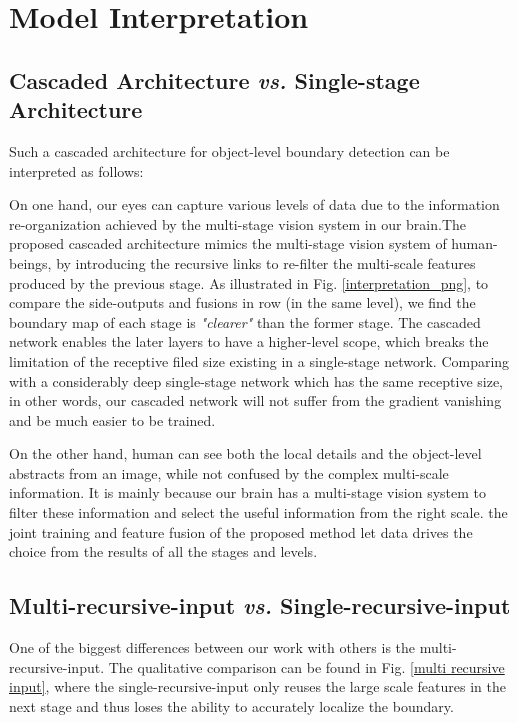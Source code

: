 \documentclass[senior]{IPSstyle}
\begin{document}
\section{Model Interpretation} \label{interpretation}
\subsection{Cascaded Architecture \emph{vs.} Single-stage Architecture}
Such a cascaded architecture for object-level boundary detection can be interpreted as follows:

On one hand, our eyes can capture various levels of data due to the information re-organization achieved by the multi-stage vision system in our brain.The proposed cascaded architecture mimics the multi-stage vision system of human-beings, by introducing the recursive links to re-filter the multi-scale features produced by the previous stage. As illustrated in Fig. \ref{interpretation_png}, to compare the side-outputs and fusions in row (in the same level), we find the boundary map of each stage is \emph{"clearer"} than the former stage. The cascaded network enables the later layers to have a higher-level scope, which breaks the limitation of the receptive filed size existing in a single-stage network. Comparing with a considerably deep single-stage network which has the same receptive size, in other words, our cascaded network will not suffer from the gradient vanishing  and be much easier to be trained.

On the other hand, human can see both the local details and the object-level abstracts from an image, while not confused by the complex multi-scale information. It is mainly because our brain has a multi-stage vision system to filter these information and select the useful information from the right scale\cite{Helmstaedter2013}. the joint training and feature fusion of the proposed method let data drives the choice from the results of all the stages and levels.

\subsection{Multi-recursive-input \emph{vs.} Single-recursive-input}

One of the biggest differences between our work with others is the multi-recursive-input. The qualitative comparison can be found in Fig. \ref{multi recursive input}, where the single-recursive-input only reuses the large scale features in the next stage and thus loses the ability to accurately localize the boundary.
\end{document}
